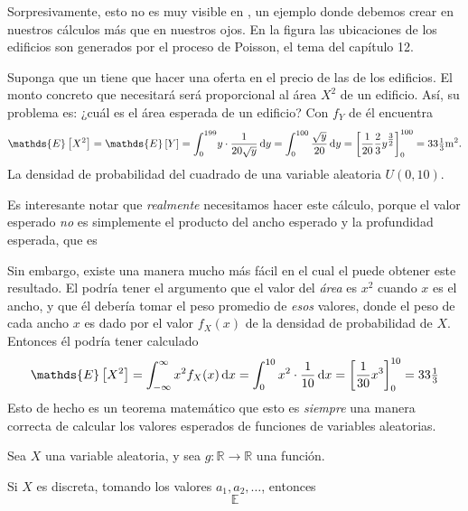 Sorpresivamente, esto no es muy visible en %
, un ejemplo donde debemos crear en nuestros cálculos más que en nuestros ojos. En la figura las ubicaciones de los edificios son generados por el proceso de Poisson, el tema del capítulo 12.

Suponga que un %
tiene que hacer una oferta en el precio de las %
de los edificios. El monto concreto que necesitará será proporcional al área $X^2$ de un edificio. Así, su problema es: ¿cuál es el área esperada de un edificio? Con $f_Y$ de %
él encuentra
\begin{equation*}
  \mathds{E}\left[X^2\right]=\mathds{E}\left[Y\right]=\int_{0}^{199}\! y\cdot\frac{1}{20\sqrt{y}}\dl y=\int_{0}^{100}\frac{\sqrt{y}}{20}\dl y={\left[\frac{1}{20}\frac{2}{3}y^{\tfrac{3}{2}}\right]}_{0}^{100}=33\tfrac{1}{3}\mathrm{m}^2.
\end{equation*}
La densidad de probabilidad del cuadrado de una variable aleatoria $U\left(0,10\right)$.

Es interesante notar que \emph{realmente} necesitamos hacer este cálculo, porque el valor esperado \emph{no} es simplemente el producto del ancho esperado y la profundidad esperada, que es %

Sin embargo, existe una manera mucho más fácil en el cual el %
puede obtener este resultado. El podría tener el argumento que el valor del \emph{área} es $x^2$ cuando $x$ es el ancho, y que él debería tomar el peso  promedio de \emph{esos} valores, donde el peso de cada ancho $x$ es dado por el valor $f_X(x)$ de la densidad de probabilidad de $X$. Entonces él podría tener calculado
\begin{equation*}
  \mathds{E}\left[X^2\right]=\int_{-\infty}^{\infty}x^2f_X(x)\dl x=\int_{0}^{10}x^2\cdot\frac{1}{10}\dl x={\left[\frac{1}{30}x^3\right]}_{0}^{10}=33\tfrac{1}{3}%
\end{equation*}
Esto de hecho es un teorema matemático que esto es \emph{siempre} una manera correcta de calcular los valores esperados de funciones de variables aleatorias.

\begin{theorem}
  Sea $X$ una variable aleatoria, y sea $g\colon\mathds{R}\rightarrow\mathds{R}$ una función.

  Si $X$ es discreta, tomando los valores $a_1, a_2, \ldots$, entonces
  \begin{equation*}
    \mathds{E}%
  \end{equation*}
\end{theorem}